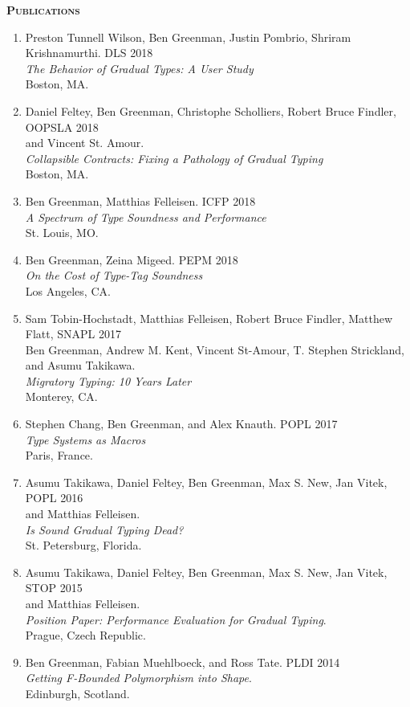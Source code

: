 \documentclass{article}
\newcommand{\mysection}[1]{\vspace{0.5cm}
\hspace{-1.3cm}\textsc{\textbf{#1}}~\hrulefill}
\begin{document}
\mysection{Publications}
\begin{enumerate}
\item
  Preston Tunnell Wilson, Ben Greenman, Justin Pombrio, Shriram Krishnamurthi. \hfill DLS 2018 \\
  \emph{The Behavior of Gradual Types: A User Study} \\
  Boston, MA.
\item
  Daniel Feltey, Ben Greenman, Christophe Scholliers, Robert Bruce Findler, \hfill OOPSLA 2018 \\
  and Vincent St. Amour. \\
  \emph{Collapsible Contracts: Fixing a Pathology of Gradual Typing} \\
  Boston, MA.
\item
  Ben Greenman, Matthias Felleisen. \hfill ICFP 2018 \\
  \emph{A Spectrum of Type Soundness and Performance} \\
  St. Louis, MO.
\item
  Ben Greenman, Zeina Migeed. \hfill PEPM 2018 \\
  \emph{On the Cost of Type-Tag Soundness} \\
  Los Angeles, CA.
\item
  Sam Tobin-Hochstadt, Matthias Felleisen, Robert Bruce Findler, Matthew Flatt, \hfill SNAPL 2017 \\
  Ben Greenman, Andrew M. Kent, Vincent St-Amour, T. Stephen Strickland, \\
  and Asumu Takikawa. \\
  \emph{Migratory Typing: 10 Years Later} \\
  Monterey, CA.
\item
  Stephen Chang, Ben Greenman, and Alex Knauth. \hfill POPL 2017 \\
   \emph{Type Systems as Macros} \\
  Paris, France.
\item
  Asumu Takikawa, Daniel Feltey, Ben Greenman, Max S. New, Jan Vitek, \hfill POPL 2016 \\
   and Matthias Felleisen. \\
   \emph{Is Sound Gradual Typing Dead?} \\
  St. Petersburg, Florida.
\item
  Asumu Takikawa, Daniel Feltey, Ben Greenman, Max S. New, Jan Vitek, \hfill STOP 2015 \\
   and Matthias Felleisen. \\
   \emph{Position Paper: Performance Evaluation for Gradual Typing}. \\
  Prague, Czech Republic.
\item
  Ben Greenman, Fabian Muehlboeck, and Ross Tate. \hfill PLDI 2014 \\
  \emph{Getting F-Bounded Polymorphism into Shape}. \\
  Edinburgh, Scotland.
\end{enumerate}
\end{document}

